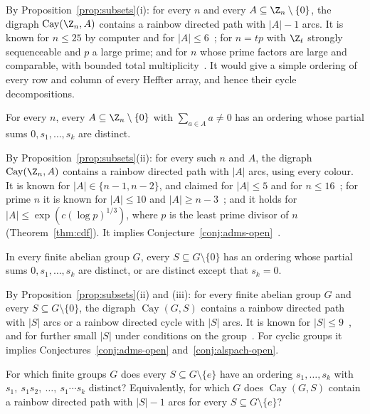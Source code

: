 By Proposition~\ref{prop:subsets}(i): for every $n$ and every $A\subseteq\Z_n\setminus\{0\}$, the digraph $\operatorname{Cay}(\Z_n,A)$ contains a rainbow directed path with $|A|-1$ arcs. It is known for $n\leq25$ by computer and for $|A|\leq6$~\cite[\S1]{hos19}; for $n=tp$ with $\Z_t$ strongly sequenceable and $p$ a large prime; and for $n$ whose prime factors are large and comparable, with bounded total multiplicity~\cite{cdfl26}. It would give a simple ordering of every row and column of every Heffter array, and hence their cycle decompositions.

\begin{conjecture}\label{conj:alspach-open}
For every $n$, every $A\subseteq\Z_n\setminus\{0\}$ with $\sum_{a\in A}a\neq0$ has an ordering whose partial sums $0,s_1,\dots,s_k$ are distinct.
\end{conjecture}

By Proposition~\ref{prop:subsets}(ii): for every such $n$ and $A$, the digraph $\operatorname{Cay}(\Z_n,A)$ contains a rainbow directed path with $|A|$ arcs, using every colour. It is known for $|A|\in\{n-1,n-2\}$, and claimed for $|A|\leq5$ and for $n\leq16$~\cite{bh05}; for prime $n$ it is known for $|A|\leq10$ and $|A|\geq n-3$~\cite{hos19}; and it holds for $|A|\leq\exp(c(\log p)^{1/3})$, where $p$ is the least prime divisor of $n$ (Theorem~\ref{thm:cdf}). It implies Conjecture~\ref{conj:adms-open}~\cite[Proposition~1.1]{admc16}.

\begin{conjecture}\label{conj:strongly}
In every finite abelian group $G$, every $S\subseteq G\setminus\{0\}$ has an ordering whose partial sums $0,s_1,\dots,s_k$ are distinct, or are distinct except that $s_k=0$.
\end{conjecture}

By Proposition~\ref{prop:subsets}(ii) and (iii): for every finite abelian group $G$ and every $S\subseteq G\setminus\{0\}$, the digraph $\operatorname{Cay}(G,S)$ contains a rainbow directed path with $|S|$ arcs or a rainbow directed cycle with $|S|$ arcs. It is known for $|S|\leq9$~\cite{al20}, and for further small $|S|$ under conditions on the group~\cite[Theorem~39]{oll25}. For cyclic groups it implies Conjectures~\ref{conj:adms-open} and~\ref{conj:alspach-open}.

\begin{problem}\label{prob:all-groups}
For which finite groups $G$ does every $S\subseteq G\setminus\{e\}$ have an ordering $s_1,\dots,s_k$ with $s_1,\ s_1s_2,\ \dots,\ s_1\cdots s_k$ distinct? Equivalently, for which $G$ does $\operatorname{Cay}(G,S)$ contain a rainbow directed path with $|S|-1$ arcs for every $S\subseteq G\setminus\{e\}$?
\end{problem}

